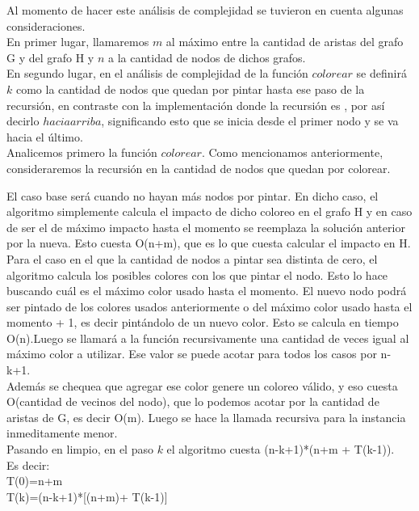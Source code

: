 \indent Al momento de hacer este análisis de complejidad se tuvieron en cuenta algunas consideraciones.\\
\indent En primer lugar, llamaremos $m$ al máximo entre la cantidad de aristas del grafo G y del grafo H  y $n$ a la cantidad de nodos de dichos grafos.\\
\indent En segundo lugar, en el análisis de complejidad de la función $colorear$ se definirá $k$ como la cantidad de nodos que quedan por pintar hasta ese paso de la recursión, en contraste con la implementación donde la recursión es , por así decirlo $hacia arriba$, significando esto que se inicia desde el primer nodo y se va hacia el último.\\

\indent Analicemos primero la función $colorear$. Como mencionamos anteriormente, consideraremos la recursión en la cantidad de nodos que quedan por colorear.

\indent El caso base será cuando no hayan más nodos por pintar. En dicho caso, el algoritmo simplemente calcula el impacto de dicho coloreo en el grafo H y en caso de ser el de máximo impacto hasta el momento se reemplaza la solución anterior por la nueva. Esto cuesta O(n+m), que es lo que cuesta calcular el impacto en H.\\
\indent Para el caso en el que la cantidad de nodos a pintar sea distinta de cero, el algoritmo calcula los posibles colores con los que pintar el nodo. Esto lo hace buscando cuál es el máximo color usado hasta el momento. El nuevo nodo podrá ser pintado de los colores usados anteriormente o del máximo color usado hasta el momento + 1, es decir pintándolo de un nuevo color. Esto se calcula en tiempo O(n).Luego se llamará a la función recursivamente una cantidad de veces igual al máximo color a utilizar. Ese valor se puede acotar para todos los casos por n-k+1.\\
\indent Además se chequea que agregar ese color genere un coloreo válido, y eso cuesta O(cantidad de vecinos del nodo), que lo podemos acotar por la cantidad de aristas de G, es decir O(m). Luego se hace la llamada recursiva para la instancia inmeditamente menor.\\
\indent Pasando en limpio, en el paso $k$ el algoritmo cuesta (n-k+1)*(n+m + T(k-1)).\\
\indent Es decir:\\

\indent T(0)=n+m\\
\indent T(k)=(n-k+1)*[(n+m)+ T(k-1)]\\

